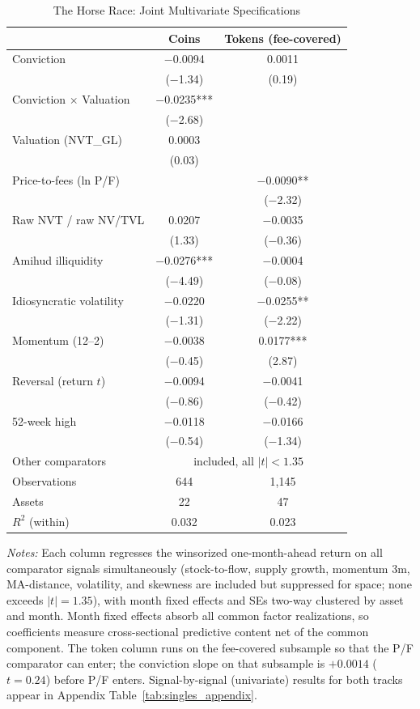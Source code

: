 \documentclass[12pt]{article}
\begin{document}
\begin{table}[ht]
\centering
\caption{The Horse Race: Joint Multivariate Specifications}
\label{tab:horserace}
\small
\begin{tabular}{lcc}
\toprule
 & Coins & Tokens (fee-covered) \\
\midrule
Conviction & $-$0.0094 & 0.0011 \\
 & ($-$1.34) & (0.19) \\
Conviction $\times$ Valuation & $-$0.0235*** & \\
 & ($-$2.68) & \\
Valuation (NVT\_GL) & 0.0003 & \\
 & (0.03) & \\
Price-to-fees (ln P/F) & & $-$0.0090** \\
 & & ($-$2.32) \\
Raw NVT / raw NV/TVL & 0.0207 & $-$0.0035 \\
 & (1.33) & ($-$0.36) \\
Amihud illiquidity & $-$0.0276*** & $-$0.0004 \\
 & ($-$4.49) & ($-$0.08) \\
Idiosyncratic volatility & $-$0.0220 & $-$0.0255** \\
 & ($-$1.31) & ($-$2.22) \\
Momentum (12--2) & $-$0.0038 & 0.0177*** \\
 & ($-$0.45) & (2.87) \\
Reversal (return $t$) & $-$0.0094 & $-$0.0041 \\
 & ($-$0.86) & ($-$0.42) \\
52-week high & $-$0.0118 & $-$0.0166 \\
 & ($-$0.54) & ($-$1.34) \\
Other comparators & \multicolumn{2}{c}{included, all $|t| < 1.35$} \\
\midrule
Observations & 644 & 1,145 \\
Assets & 22 & 47 \\
$R^2$ (within) & 0.032 & 0.023 \\
\bottomrule
\end{tabular}
\smallskip

\parbox{0.9\linewidth}{\footnotesize
\textit{Notes:} Each column regresses the winsorized one-month-ahead return on all
comparator signals simultaneously (stock-to-flow, supply growth, momentum 3m,
MA-distance, volatility, and skewness are included but suppressed for space; none
exceeds $|t| = 1.35$), with month fixed effects and SEs two-way clustered by asset and
month. Month fixed effects absorb all common factor realizations, so coefficients
measure cross-sectional predictive content net of the common component. The token
column runs on the fee-covered subsample so that the P/F comparator can enter; the
conviction slope on that subsample is $+0.0014$ ($t=0.24$) before P/F enters.
Signal-by-signal (univariate) results for both tracks appear in Appendix
Table~\ref{tab:singles_appendix}.}
\end{table}
\end{document}
